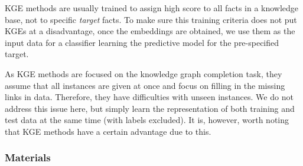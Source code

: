 KGE methods are usually trained to assign high score to all facts in a knowledge base, not to specific \textit{target} facts.
To make sure this training criteria does not put KGEs at a disadvantage, once the embeddings are obtained, we use them as the input data for a classifier learning the predictive model for the pre-specified target.



As KGE methods are focused on the knowledge graph completion task, they assume that all instances are given at once and focus on filling in the missing links in data.
Therefore, they have difficulties with unseen instances.
We do not address this issue here, but simply learn the representation of both training and test data at the same time (with labels excluded).
It is, however, worth noting that KGE methods have a certain advantage due to this.


\subsubsection{Materials}



